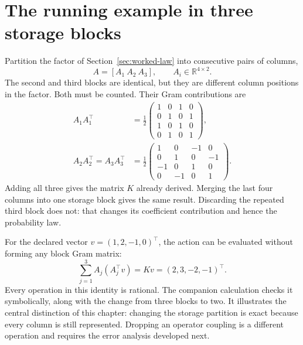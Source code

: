 \section{The running example in three storage blocks}\label{sec:worked-stream}
Partition the factor of Section~\ref{sec:worked-law} into consecutive pairs of columns,
\[
A=[A_1\ A_2\ A_3],\qquad A_i\in\mathbb R^{4\times2}.
\]
The second and third blocks are identical, but they are different column positions in the factor. Both must be counted. Their Gram contributions are
\begin{align*}
A_1A_1^\top&=\frac12
\begin{pmatrix}1&0&1&0\\0&1&0&1\\1&0&1&0\\0&1&0&1\end{pmatrix},\\
A_2A_2^\top=A_3A_3^\top&=\frac12
\begin{pmatrix}1&0&-1&0\\0&1&0&-1\\-1&0&1&0\\0&-1&0&1\end{pmatrix}.
\end{align*}
Adding all three gives the matrix $K$ already derived. Merging the last four columns into one storage block gives the same result. Discarding the repeated third block does not: that changes its coefficient contribution and hence the probability law.

For the declared vector $v=(1,2,-1,0)^\top$, the action can be evaluated without forming any block Gram matrix:
\[
\sum_{j=1}^3 A_j(A_j^\top v)=Kv=(2,3,-2,-1)^\top.
\]
Every operation in this identity is rational. The companion calculation checks it symbolically, along with the change from three blocks to two. It illustrates the central distinction of this chapter: changing the storage partition is exact because every column is still represented. Dropping an operator coupling is a different operation and requires the error analysis developed next.
